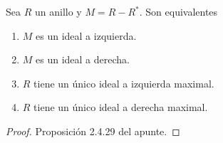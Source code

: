 \begin{prop}
    Sea \(R\) un anillo y \(M = R - R^*\). Son equivalentes \begin{enumerate}
        \item \(M\) es un ideal a izquierda.
        \item \(M\) es un ideal a derecha.
        \item \(R\) tiene un único ideal a izquierda maximal.
        \item \(R\) tiene un único ideal a derecha maximal.
    \end{enumerate}

    \begin{proof}
        Proposición 2.4.29 del apunte.
    \end{proof}
\end{prop}